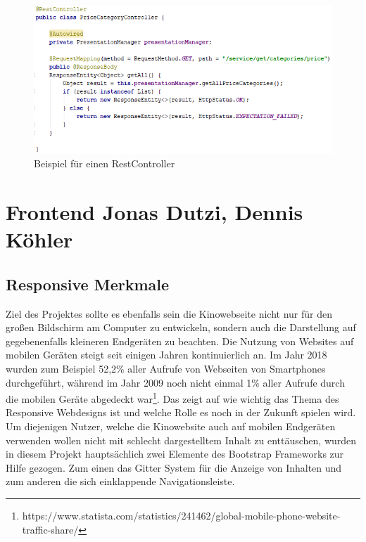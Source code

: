 \begin{figure}[H]
	\centering 
	\includegraphics[width=\textwidth]{img/beispiel_restcontroller}
	\captionsetup{format=hang}
	\caption[Beispiel für einen RestController]{\label{fig:beispiel_restcontroller}Beispiel für einen RestController}
\end{figure}	

	
	\section[Frontend]{Frontend {\hfill \normalsize Jonas Dutzi, Dennis Köhler}}
	
	\subsection{Responsive Merkmale}
	Ziel des Projektes sollte es ebenfalls sein die Kinowebseite nicht nur für den großen Bildschirm am Computer zu entwickeln, sondern auch die Darstellung auf gegebenenfalls kleineren Endgeräten zu beachten. Die Nutzung von Websites auf mobilen Geräten steigt seit einigen Jahren kontinuierlich an. Im Jahr 2018 wurden zum Beispiel 52,2\% aller Aufrufe von Webseiten von Smartphones durchgeführt, während im Jahr 2009 noch nicht einmal 1\% aller Aufrufe durch die mobilen Geräte abgedeckt war\footnote{https://www.statista.com/statistics/241462/global-mobile-phone-website-traffic-share/}. Das zeigt auf wie wichtig das Thema des Responsive Webdesigns ist und welche Rolle es noch in der Zukunft spielen wird. Um diejenigen Nutzer, welche die Kinowebsite auch auf mobilen Endgeräten verwenden wollen nicht mit schlecht dargestelltem Inhalt zu enttäuschen, wurden in diesem Projekt hauptsächlich zwei Elemente des Bootstrap Frameworks zur Hilfe gezogen. Zum einen das Gitter System für die Anzeige von Inhalten und zum anderen die sich einklappende Navigationsleiste.
	

